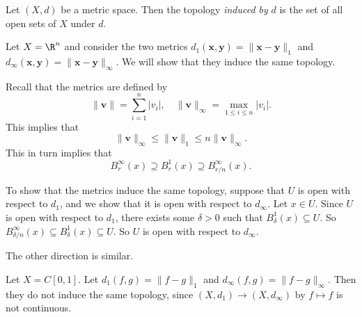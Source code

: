 \documentclass[a4paper]{article}
\begin{document}
\begin{defi}
  Let $(X, d)$ be a metric space. Then the topology \emph{induced by} $d$ is the set of all open sets of $X$ under $d$.
\end{defi}

\begin{eg}
  Let $X = \R^n$ and consider the two metrics $d_1(\mathbf{x}, \mathbf{y}) = \|\mathbf{x} - \mathbf{y}\|_1$ and $d_\infty(\mathbf{x}, \mathbf{y}) = \|\mathbf{x} - \mathbf{y}\|_\infty$. We will show that they induce the same topology.

  Recall that the metrics are defined by
  \[
    \|\mathbf{v}\| = \sum_{i = 1}^n |v_i|,\quad \|\mathbf{v}\|_\infty = \max_{1 \leq i \leq n}|v_i|.
  \]
  This implies that
  \[
    \|\mathbf{v}\|_\infty \leq \|\mathbf{v}\|_1 \leq n\|\mathbf{v}\|_\infty.
  \]
  This in turn implies that
  \[
    B_r^\infty(x) \supseteq B_r^1 (x) \supseteq B_{r/n}^\infty(x).
  \]
  \begin{center}
  \end{center}
  To show that the metrics induce the same topology, suppose that $U$ is open with respect to $d_1$, and we show that it is open with respect to $d_\infty$. Let $x \in U$. Since $U$ is open with respect to $d_1$, there exists some $\delta > 0$ such that $B_\delta^1(x)\subseteq U$. So $B_{\delta/n}^\infty (x) \subseteq B_\delta^1(x) \subseteq U$. So $U$ is open with respect to $d_\infty$.

  The other direction is similar.
\end{eg}

\begin{eg}
  Let $X = C[0, 1]$. Let $d_1(f, g) = \|f - g\|_1$ and $d_\infty(f, g) = \|f - g\|_\infty$. Then they do not induce the same topology, since $(X, d_1) \to (X, d_\infty)$ by $f\mapsto f$ is not continuous.
\end{eg}
\end{document}
